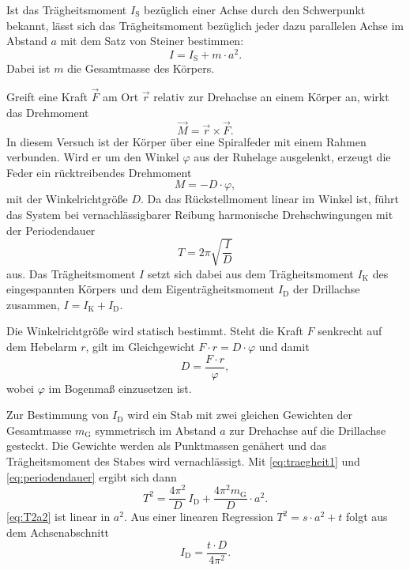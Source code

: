 Ist das Trägheitsmoment $I_\text{S}$ bezüglich einer Achse durch den Schwerpunkt bekannt,
lässt sich das Trägheitsmoment bezüglich jeder dazu parallelen Achse im Abstand $a$ mit dem Satz von Steiner bestimmen:
\begin{equation}
    I = I_\text{S} + m \cdot a^2 .
    \label{eq:steiner}
\end{equation}
Dabei ist $m$ die Gesamtmasse des Körpers.

Greift eine Kraft $\vec{F}$ am Ort $\vec{r}$ relativ zur Drehachse an einem Körper an, wirkt das Drehmoment
\begin{equation}
    \vec{M} = \vec{r} \times \vec{F} .
    \label{eq:drehmoment}
\end{equation}
In diesem Versuch ist der Körper über eine Spiralfeder mit einem Rahmen verbunden.
Wird er um den Winkel $\varphi$ aus der Ruhelage ausgelenkt, erzeugt die Feder ein rücktreibendes Drehmoment
\begin{equation}
    M = - D \cdot \varphi ,
    \label{eq:rueckstell}
\end{equation}
mit der Winkelrichtgröße $D$.
Da das Rückstellmoment linear im Winkel ist, führt das System bei vernachlässigbarer Reibung harmonische Drehschwingungen mit der Periodendauer
\begin{equation}
    T = 2\pi \sqrt{\frac{I}{D}}
    \label{eq:periodendauer}
\end{equation}
aus. Das Trägheitsmoment $I$ setzt sich dabei aus dem Trägheitsmoment $I_\text{K}$ des eingespannten Körpers
und dem Eigenträgheitsmoment $I_\text{D}$ der Drillachse zusammen, $I = I_\text{K} + I_\text{D}$.

Die Winkelrichtgröße wird statisch bestimmt. Steht die Kraft $F$ senkrecht auf dem Hebelarm $r$,
gilt im Gleichgewicht $F \cdot r = D \cdot \varphi$ und damit
\begin{equation}
    D = \frac{F \cdot r}{\varphi} ,
    \label{eq:winkelrichtgroesse}
\end{equation}
wobei $\varphi$ im Bogenmaß einzusetzen ist.

Zur Bestimmung von $I_\text{D}$ wird ein Stab mit zwei gleichen Gewichten der Gesamtmasse $m_\text{G}$
symmetrisch im Abstand $a$ zur Drehachse auf die Drillachse gesteckt.
Die Gewichte werden als Punktmassen genähert und das Trägheitsmoment des Stabes wird vernachlässigt.
Mit \autoref{eq:traegheit1} und \autoref{eq:periodendauer} ergibt sich dann
\begin{equation}
    T^2 = \frac{4\pi^2}{D} \, I_\text{D} + \frac{4\pi^2 m_\text{G}}{D} \cdot a^2 .
    \label{eq:T2a2}
\end{equation}
\autoref{eq:T2a2} ist linear in $a^2$. Aus einer linearen Regression $T^2 = s \cdot a^2 + t$ folgt aus dem Achsenabschnitt
\begin{equation}
    I_\text{D} = \frac{t \cdot D}{4\pi^2} .
    \label{eq:ID}
\end{equation}

